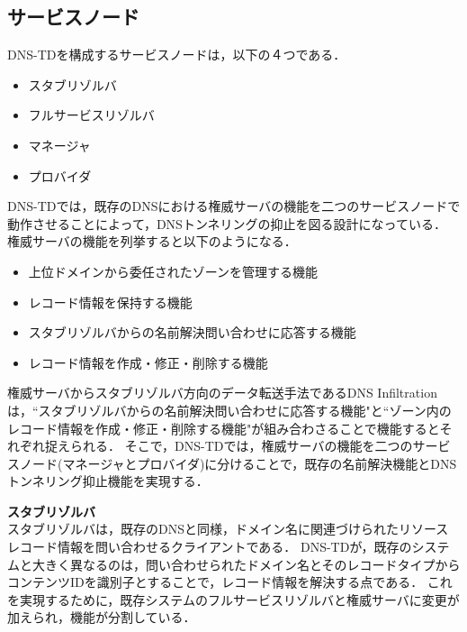 \subsection{サービスノード}
DNS-TDを構成するサービスノードは，以下の４つである．
\begin{itemize}
 \item スタブリゾルバ
	\vspace{-3mm}
 \item フルサービスリゾルバ
	\vspace{-3mm}
 \item マネージャ
	\vspace{-3mm}
 \item プロバイダ
\end{itemize}

DNS-TDでは，既存のDNSにおける権威サーバの機能を二つのサービスノードで動作させることによって，DNSトンネリングの抑止を図る設計になっている．
権威サーバの機能を列挙すると以下のようになる．
\begin{itemize}
 \item 上位ドメインから委任されたゾーンを管理する機能
	\vspace{-3mm}
 \item レコード情報を保持する機能
	\vspace{-3mm}
 \item スタブリゾルバからの名前解決問い合わせに応答する機能
	\vspace{-3mm}
 \item レコード情報を作成・修正・削除する機能
\end{itemize}
権威サーバからスタブリゾルバ方向のデータ転送手法であるDNS Infiltrationは，``スタブリゾルバからの名前解決問い合わせに応答する機能"と``ゾーン内のレコード情報を作成・修正・削除する機能"が組み合わさることで機能するとそれぞれ捉えられる．
そこで，DNS-TDでは，権威サーバの機能を二つのサービスノード(マネージャとプロバイダ)に分けることで，既存の名前解決機能とDNSトンネリング抑止機能を実現する．\newline

\hspace{-12pt}\textbf{スタブリゾルバ}\\
\hspace{12pt}スタブリゾルバは，既存のDNSと同様，ドメイン名に関連づけられたリソースレコード情報を問い合わせるクライアントである．
DNS-TDが，既存のシステムと大きく異なるのは，問い合わせられたドメイン名とそのレコードタイプからコンテンツIDを識別子とすることで，レコード情報を解決する点である．
これを実現するために，既存システムのフルサービスリゾルバと権威サーバに変更が加えられ，機能が分割している．\newline

